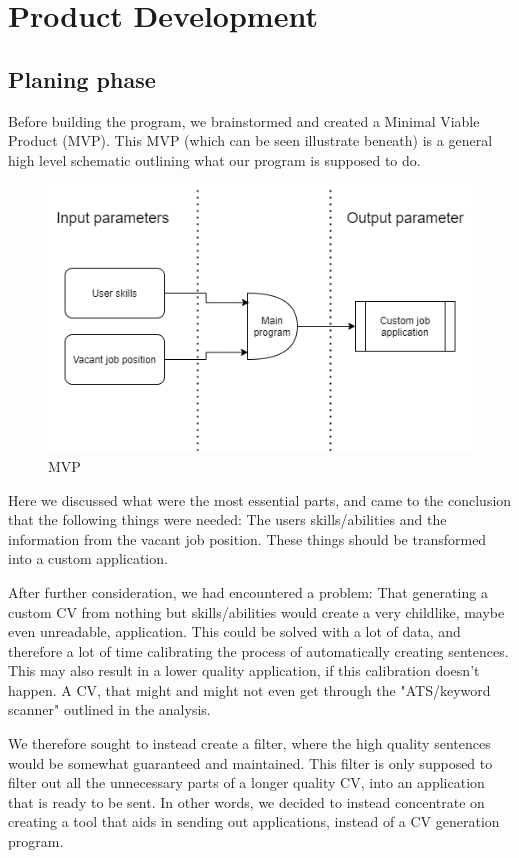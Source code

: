 \section{Product Development}\label{sec:product_development}
\subsection{Planing phase}
Before building the program, we brainstormed and created a Minimal Viable Product (MVP).
This MVP (which can be seen illustrate beneath) is a general high level schematic outlining what our program is supposed to do.

\begin{figure}[H]
  \centering
  \includegraphics[scale = 0.6]{figures/engMVP}
  \caption{MVP}
\end{figure}
Here we discussed what were the most essential parts, and came to the conclusion that the following things
were needed: The users skills/abilities and the information from the vacant job position. These things
should be transformed into a custom application. 

After further consideration, we had encountered a problem: That generating a custom CV from nothing but
skills/abilities would create a very childlike, maybe even unreadable, application. This could be solved with a lot
of data, and therefore a lot of time calibrating the process of automatically creating sentences. This may also result
in a lower quality application, if this calibration doesn't happen. 
A CV, that might and might not even get through the "ATS/keyword scanner" outlined in the analysis. 

We therefore sought to instead create a filter, where the high quality sentences would be somewhat guaranteed and maintained.
This filter is only supposed to filter out all the unnecessary parts of a longer quality CV, into an application that
is ready to be sent. In other words, we decided to instead concentrate on creating a tool that aids
in sending out applications, instead of a CV generation program.

